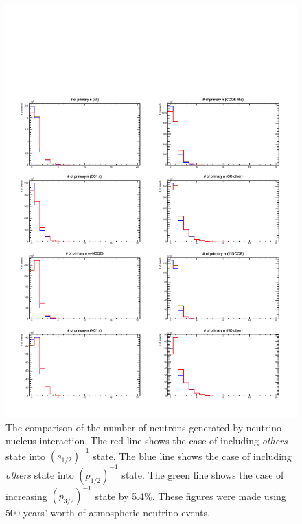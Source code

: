 \begin{figure}[h]
	\centering
	\includegraphics[width=16cm]{PDF/NEUT/Comparison/neutron/NumPri}
	\caption[The comparison of the number of neutrons generated by neutrino-nucleus interaction]{
	The comparison of the number of neutrons generated by neutrino-nucleus interaction.
	The red line shows the case of including \textit{others} state into $(s_{1/2})^{-1}$ state.
	The blue line shows the case of including \textit{others} state into $(p_{1/2})^{-1}$ state.
	The green line shows the case of increasing $(p_{3/2})^{-1}$ state by 5.4\%.
	These figures were made using 500 years' worth of atmospheric neutrino events.
	}\label{Comp_neutronNumPri}
\end{figure}

